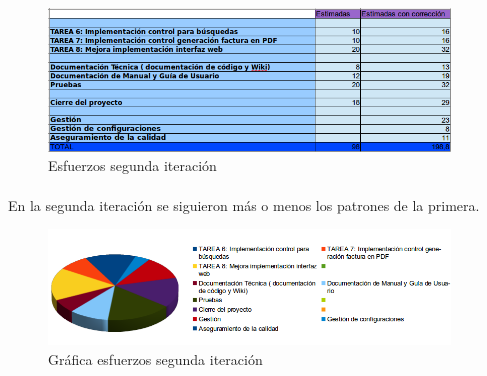 \begin{figure}[h!]
\centering
\includegraphics[width=0.95\textwidth]{img/6143}
\caption{Esfuerzos segunda iteración}
 \label{fig:6143}
\end{figure}

\paragraph{} En la segunda iteración se siguieron más o menos los patrones de la primera.

\begin{figure}[h!]
\centering
\includegraphics[width=0.95\textwidth]{img/6144}
\caption{Gráfica esfuerzos segunda iteración}
 \label{fig:6144}
\end{figure}
